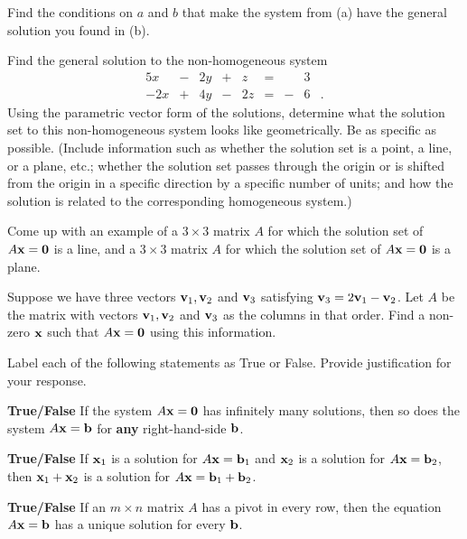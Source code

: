 	\item Find the conditions on $a$ and $b$ that make the system from (a) have the general solution you found in (b). 
	

	\ea
	
\item Find the general solution to the non-homogeneous system
\begin{alignat*}{5}
{}x 		&{}-{} 	&{2}y 	&{}+{}	&{}z		&{}={}	&{}&3&{} \\
{-2}x	&{}+{} 	&{4}y 	&{}-{}	&{2}z	&{}={}	&{-}&6&{.}
\end{alignat*} 
Using the parametric vector form of the solutions, determine what the solution set to this non-homogeneous system looks like geometrically. Be as specific as possible. (Include information such as whether the solution set is a point, a line, or a plane, etc.; whether the solution set passes through the origin or is shifted from the origin in a specific direction by a specific number of units; and how the solution is related to the corresponding homogeneous system.)

\item Come up with an example of a $3\times 3$ matrix $A$ for which the solution set of $A\mathbf{x}=\mathbf{0}$ is a line, and a $3\times 3$ matrix $A$ for which the solution set of $A\mathbf{x}=\mathbf{0}$ is a plane.

\item Suppose we have three vectors $\mathbf{v}_1, \mathbf{v}_2$ and $\mathbf{v}_3$ satisfying $\mathbf{v}_3=2\mathbf{v}_1-\mathbf{v}_2$. Let $A$ be the matrix with vectors $\mathbf{v}_1, \mathbf{v}_2$ and $\mathbf{v}_3$ as the columns in that order. Find a non-zero $\mathbf{x}$ such that $A\mathbf{x}=\mathbf{0}$ using this information.

\item Label each of the following statements as True or False. Provide justification for your response.
\ba
\item \textbf{True/False} If the system $A\mathbf{x} = \mathbf{0}$ has infinitely many solutions, then so does the system $A\mathbf{x}=\mathbf{b}$ for \textbf{any} right-hand-side $\mathbf{b}$.

\item \textbf{True/False} If $\mathbf{x}_1$ is a solution for $A\mathbf{x}=\mathbf{b}_1$ and $\mathbf{x}_2$ is a solution for $A\mathbf{x}=\mathbf{b}_2$, then $\mathbf{x}_1+\mathbf{x}_2$ is a solution for $A\mathbf{x}=\mathbf{b}_1+\mathbf{b}_2$.

\item \textbf{True/False} If an $m \times n$ matrix $A$ has a pivot in every row, then the equation $A\mathbf{x}=\mathbf{b}$ has a unique solution for every $\mathbf{b}$.

